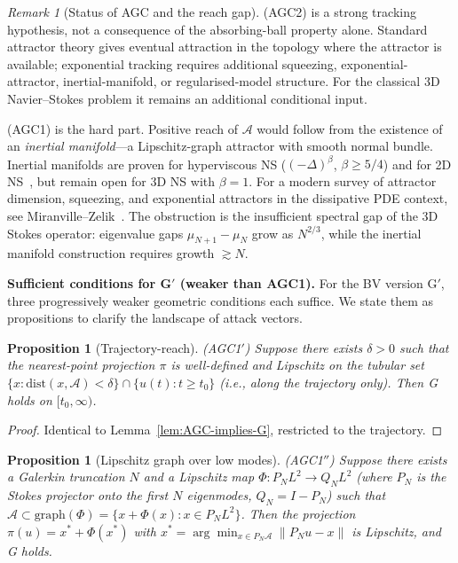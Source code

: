 \documentclass[12pt,a4paper]{article}
\theoremstyle{definition}
\theoremstyle{plain}
\newtheorem{proposition}[definition]{Proposition}
\theoremstyle{remark}
\newtheorem{remark}[definition]{Remark}
\begin{document}
\begin{remark}[Status of AGC and the reach gap]
\label{rem:AGC-status}
\textup{(AGC2)} is a strong tracking hypothesis, not a consequence of
the absorbing-ball property alone.  Standard attractor theory gives
eventual attraction in the topology where the attractor is available;
exponential tracking requires additional squeezing, exponential-attractor,
inertial-manifold, or regularised-model structure.  For the classical
3D Navier--Stokes problem it remains an additional conditional input.

\textup{(AGC1)} is the hard part.
Positive reach of $\mathcal{A}$ would follow from the existence of an
\emph{inertial manifold}---a Lipschitz-graph attractor with smooth
normal bundle. Inertial manifolds are proven for hyperviscous NS
($(-\Delta)^\beta$, $\beta \ge 5/4$) and for 2D
NS~\cite{MalletParetSell1988,EdenFoiasNicolaenko1994}, but remain open for 3D NS with $\beta=1$.
For a modern survey of attractor dimension, squeezing, and exponential
attractors in the dissipative PDE context, see Miranville--Zelik~\cite{MiranvilleZelik2008}.
The obstruction is the insufficient spectral gap of the 3D Stokes
operator: eigenvalue gaps $\mu_{N+1} - \mu_N$ grow as $N^{2/3}$, while
the inertial manifold construction requires growth $\gtrsim N$.

\medskip\noindent
\textbf{Sufficient conditions for G$'$ (weaker than AGC1).}\;
For the BV version G$'$, three progressively weaker geometric
conditions each suffice. We state them as propositions to clarify
the landscape of attack vectors.

\begin{proposition}[Trajectory-reach]\label{prop:traj-reach}
\textup{(AGC1$'$)}\;
Suppose there exists $\delta > 0$ such that the nearest-point
projection $\pi$ is well-defined and Lipschitz on the tubular set
$\{x : \mathrm{dist}(x, \mathcal{A}) < \delta\}
\cap \{u(t) : t \ge t_0\}$
\textup{(}i.e., along the trajectory only\textup{)}. Then G holds
on $[t_0, \infty)$.
\end{proposition}

\begin{proof}
Identical to Lemma~\ref{lem:AGC-implies-G}, restricted to the
trajectory.
\end{proof}

\begin{proposition}[Lipschitz graph over low modes]\label{prop:graph}
\textup{(AGC1$''$)}\;
Suppose there exists a Galerkin truncation $N$ and a Lipschitz map
$\Phi : P_N L^2 \to Q_N L^2$ (where $P_N$ is the Stokes projector
onto the first $N$ eigenmodes, $Q_N = I - P_N$) such that
$\mathcal{A} \subset \mathrm{graph}(\Phi) =
\{x + \Phi(x) : x \in P_N L^2\}$.
Then the projection $\pi(u) = x^* + \Phi(x^*)$ with
$x^* = \arg\min_{x \in P_N\mathcal{A}} \|P_N u - x\|$ is Lipschitz,
and G holds.
\end{proposition}


\end{remark}
\end{document}
